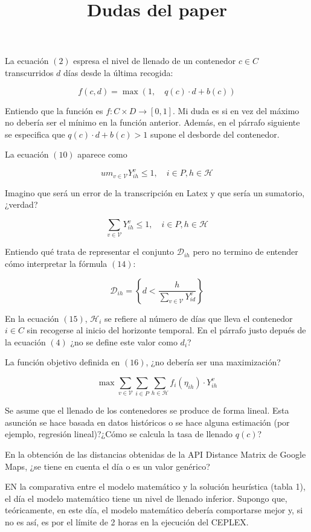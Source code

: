 \documentclass[]{article}
\title{Dudas del paper}
\author{}
\date{\vspace{-2.5em}}
\begin{document}
\maketitle

La ecuación \((2)\) espresa el nivel de llenado de un contenedor
\(c\in C\) transcurridos \(d\) días desde la última recogida:

\[
f(c, d) = \max(1, \quad q(c)\cdot d + b(c))
\]

Entiendo que la función es \(f:C\times D\rightarrow [0,1]\). Mi duda es
si en vez del máximo no debería ser el mínimo en la función anterior.
Además, en el párrafo siguiente se especifica que
\(q(c)\cdot d + b(c) > 1\) supone el desborde del contenedor.

La ecuación \((10)\) aparece como

\[
um_{v\in \mathcal{V}} Y_{ih}^v \leq 1, \quad i\in P, h\in\mathcal{H}
\]

Imagino que será un error de la transcripción en Latex y que sería un
sumatorio, ¿verdad?

\[
\sum_{v\in \mathcal{V}} Y_{ih}^v \leq 1, \quad i\in P, h\in\mathcal{H}
\]

Entiendo qué trata de representar el conjunto \(\mathcal{D}_{ih}\) pero
no termino de entender cómo interpretar la fórmula \((14)\):

\[
\mathcal{D}_{ih} = \left\{ d < \frac{h}{\sum_{v\in \mathcal{V}} Y_{id}^v} \right\}
\]

En la ecuación \((15)\), \(\mathcal{H}_i\) se refiere al número de días
que lleva el contenedor \(i\in C\) sin recogerse al inicio del horizonte
temporal. En el párrafo justo depués de la ecuación \((4)\) ¿no se
define este valor como \(d_i\)?

La función objetivo definida en \((16)\), ¿no debería ser una
maximización?

\[
\max \sum_{v\in \mathcal{V}} \sum_{i\in P}\sum_{h\in \mathcal{H}} f_i(\eta_{ih})\cdot Y_{ih}^v
\]

Se asume que el llenado de los contenedores se produce de forma lineal.
Esta asunción se hace basada en datos históricos o se hace alguna
estimación (por ejemplo, regresión lineal)?¿Cómo se calcula la tasa de
llenado \(q(c)\)?

En la obtención de las distancias obtenidas de la API Distance Matrix de
Google Maps, ¿se tiene en cuenta el día o es un valor genérico?

EN la comparativa entre el modelo matemático y la solución heurística
(tabla 1), el día el modelo matemático tiene un nivel de llenado
inferior. Supongo que, teóricamente, en este día, el modelo matemático
debería comportarse mejor y, si no es así, es por el límite de 2 horas
en la ejecución del CEPLEX.
\end{document}
